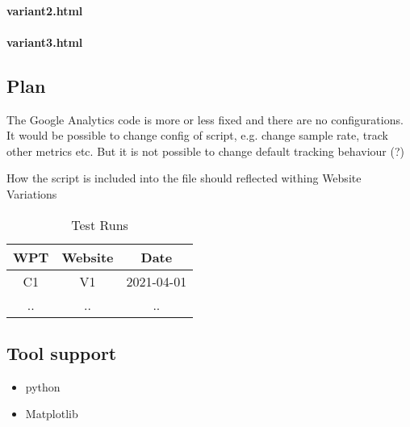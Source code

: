 \paragraph{variant2.html}

\paragraph{variant3.html}

\subsection{Plan}

The Google Analytics code is more or less fixed and there are no configurations.
It would be possible to change config of script, e.g. change sample rate, track other metrics etc.
But it is not possible to change default tracking behaviour (?)

How the script is included into the file should reflected withing Website Variations

\begin{table}[h]
	\caption[Test Runs]{Test Runs \cite{DBLP:books/infix/Schwarz99}}
	\label{tab:tamodelleVergleich}
	\centering
	\begin{tabular}{ |c|c|c } 
	 \hline
	  WPT & Website & Date \\
	  \hline
	  C1 & V1 & 2021-04-01 \\ 
	  .. & .. & ..\\ 
	  \hline
	  \end{tabular}
\end{table}


\subsection{Tool support}

\begin{itemize}
\item python
\item Matplotlib
\end{itemize}

